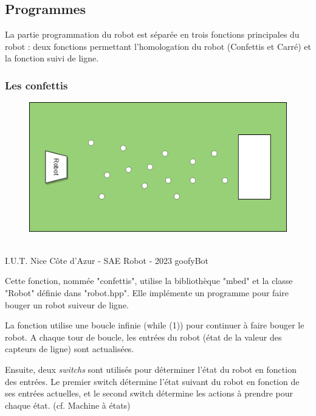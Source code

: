 \subsection{Programmes}

La partie programmation du robot est séparée en trois fonctions principales du robot : deux fonctions permettant l'homologation du robot (Confettis et Carré) et la fonction suivi de ligne.

\subsubsection{Les confettis}

\begin{figure}[H]
\centering
\begin{minipage}{.5\textwidth}
  \centering
  \centerline{\includegraphics[width=1\linewidth]{img/parcours/confettie.png}}
  \label{fig:confettis}
\end{minipage}%
\end{figure}

\vfill
\noindent\makebox[\linewidth]{\rule{.8\paperwidth}{.6pt}}\\[0.2cm]
I.U.T. Nice Côte d'Azur - SAE Robot - 2023 \hfill goofyBot
\noindent\makebox[\linewidth]{\rule{.8\paperwidth}{.6pt}}
\newpage

Cette fonction, nommée "confettis", utilise la bibliothèque "mbed" et la classe "Robot" définie dans "robot.hpp". Elle implémente un programme pour faire bouger un robot suiveur de ligne.

La fonction utilise une boucle infinie (while (1)) pour continuer à faire bouger le robot. A chaque tour de boucle, les entrées du robot (état de la valeur des capteurs de ligne) sont actualisées.

Ensuite, deux \emph{switchs} sont utilisés pour déterminer l'état du robot en fonction des entrées. Le premier switch détermine l'état suivant du robot en fonction de ses entrées actuelles, et le second switch détermine les actions à prendre pour chaque état. (cf. Machine à états)

